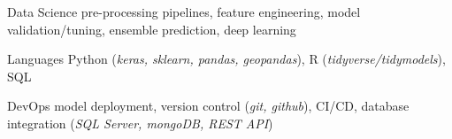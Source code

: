 

\begin{cvskills}

  \cvskill
    {Data Science} %
    {pre-processing pipelines, feature engineering, model validation/tuning, ensemble prediction, deep learning} %

  \cvskill
    {Languages} %
    {Python (\small\textit{keras, sklearn, pandas, geopandas}), R (\small\textit{tidyverse/tidymodels}), SQL} %

  \cvskill
    {DevOps} %
    {model deployment, version control (\small\textit{git, github}), CI/CD, database integration (\small\textit{SQL Server, mongoDB, REST API})} %
    
\end{cvskills}
